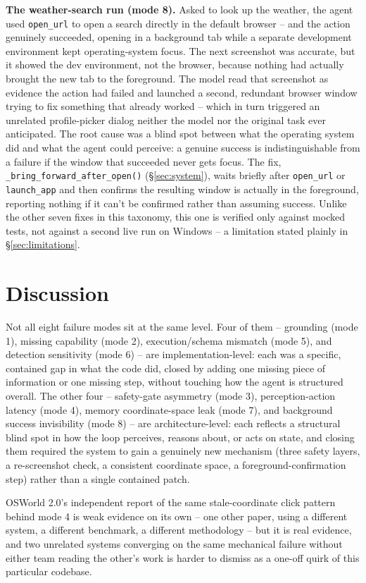 \documentclass[11pt]{article}
\begin{document}
\textbf{The weather-search run (mode 8).} Asked to look up the weather, the agent used \texttt{open\_url} to open a search directly in the default browser -- and the action genuinely succeeded, opening in a background tab while a separate development environment kept operating-system focus. The next screenshot was accurate, but it showed the dev environment, not the browser, because nothing had actually brought the new tab to the foreground. The model read that screenshot as evidence the action had failed and launched a second, redundant browser window trying to fix something that already worked -- which in turn triggered an unrelated profile-picker dialog neither the model nor the original task ever anticipated. The root cause was a blind spot between what the operating system did and what the agent could perceive: a genuine success is indistinguishable from a failure if the window that succeeded never gets focus. The fix, \texttt{\_bring\_forward\_after\_open()} (\S\ref{sec:system}), waits briefly after \texttt{open\_url} or \texttt{launch\_app} and then confirms the resulting window is actually in the foreground, reporting nothing if it can't be confirmed rather than assuming success. Unlike the other seven fixes in this taxonomy, this one is verified only against mocked tests, not against a second live run on Windows -- a limitation stated plainly in \S\ref{sec:limitations}.
\section{Discussion}
Not all eight failure modes sit at the same level. Four of them -- grounding (mode 1), missing capability (mode 2), execution/schema mismatch (mode 5), and detection sensitivity (mode 6) -- are implementation-level: each was a specific, contained gap in what the code did, closed by adding one missing piece of information or one missing step, without touching how the agent is structured overall. The other four -- safety-gate asymmetry (mode 3), perception-action latency (mode 4), memory coordinate-space leak (mode 7), and background success invisibility (mode 8) -- are architecture-level: each reflects a structural blind spot in how the loop perceives, reasons about, or acts on state, and closing them required the system to gain a genuinely new mechanism (three safety layers, a re-screenshot check, a consistent coordinate space, a foreground-confirmation step) rather than a single contained patch.

OSWorld 2.0's independent report of the same stale-coordinate click pattern behind mode 4 is weak evidence on its own -- one other paper, using a different system, a different benchmark, a different methodology -- but it is real evidence, and two unrelated systems converging on the same mechanical failure without either team reading the other's work is harder to dismiss as a one-off quirk of this particular codebase.
\end{document}
